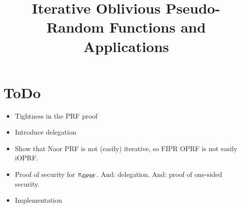 \documentclass{article}
\begin{document}
\title{Iterative Oblivious Pseudo-Random Functions and Applications}
\author{}\date{}
\maketitle

\section{ToDo}
\begin{itemize}
\item Tightness in the PRF proof
\item Introduce delegation
\item Show that Naor PRF is not (easily) iterative, so FIPR OPRF is not easily iOPRF.
\item Proof of security for ${\pi_{\mathsf{i}\mathsf{OPRF}}}$. And: delegation. And: proof of one-sided security.
\item Implementation
  
\end{itemize}









\end{document}
